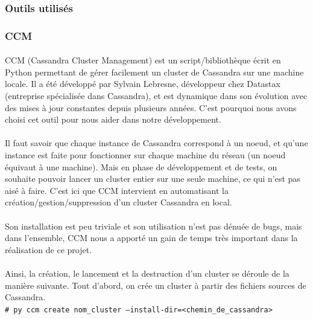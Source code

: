 \documentclass[12pt]{article}
\newcommand{\shellcmd}[1]{\\\indent\indent\texttt{\footnotesize\# #1}\\}
\begin{document}
\subsubsection{Outils utilisés}

\subsubsection*{CCM}

\paragraph{}CCM (Cassandra Cluster Management) est un script/bibliothèque écrit en Python permettant de gérer facilement un cluster de Cassandra sur une machine locale. Il a été développé par Sylvain Lebresne, développeur chez Datastax (entreprise spécialisée dans Cassandra), et est dynamique dans son évolution avec des mises à jour constantes depuis plusieurs années. C'est pourquoi nous avons choisi cet outil pour nous aider dans notre développement.

\paragraph{}Il faut savoir que chaque instance de Cassandra correspond à un noeud, et qu'une instance est faite pour fonctionner sur chaque machine du réseau (un noeud équivaut à une machine). Mais en phase de développement et de tests, on souhaite pouvoir lancer un cluster entier sur une seule machine, ce qui n'est pas aisé à faire. C'est ici que CCM intervient en automatisant la création/gestion/suppression d'un cluster Cassandra en local.

\paragraph{}Son installation est peu triviale et son utilisation n'est pas dénuée de bugs, mais dans l'ensemble, CCM nous a apporté un gain de temps très important dans la réalisation de ce projet.

\paragraph{}Ainsi, la création, le lancement et la destruction d'un cluster se déroule de la manière suivante. Tout d'abord, on crée un cluster à partir des fichiers sources de Cassandra.
\shellcmd{py ccm create nom\_cluster --install-dir=<chemin\_de\_cassandra>}
\end{document}
